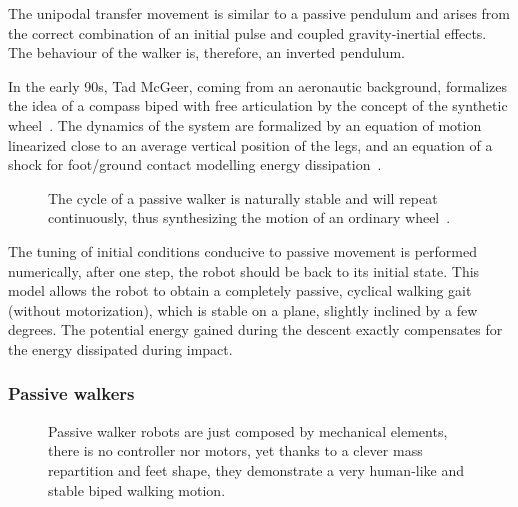 The unipodal transfer movement is similar to a passive pendulum and arises from the correct combination of an initial pulse and coupled gravity-inertial effects. The behaviour of the walker is, therefore, an inverted pendulum.

In the early 90s, Tad McGeer, coming from an aeronautic background, formalizes the idea of a compass biped with free articulation by the concept of the synthetic wheel~\parencite{mcgeer1990passive}.
The dynamics of the system are formalized by an equation of motion linearized close to an average vertical position of the legs, and an equation of a shock for foot/ground contact modelling energy dissipation~\parencite{mcgeer1992principles}.

\begin{figure}[tb]
\centering
    \hfil
    \caption{The cycle of a passive walker is naturally stable and will repeat continuously, thus synthesizing the motion of an ordinary wheel~\parencite{mcgeer1992principles}.}
    \label{fig:synthetic-wheel}
\end{figure}


The tuning of initial conditions conducive to passive movement is performed numerically, after one step, the robot should be back to its initial state. This model allows the robot to obtain a completely passive, cyclical walking gait (without motorization), which is stable on a plane, slightly inclined by a few degrees. The potential energy gained during the descent exactly compensates for the energy dissipated during impact.


\subsubsection{Passive walkers} %

\begin{figure}[tb]
\centering
    \hfil
    \caption{Passive walker robots are just composed by mechanical elements, there is no controller nor motors, yet thanks to a clever mass repartition and feet shape, they demonstrate a very human-like and stable biped walking motion.}
    \label{fig:mcgeer_work}
\end{figure}

